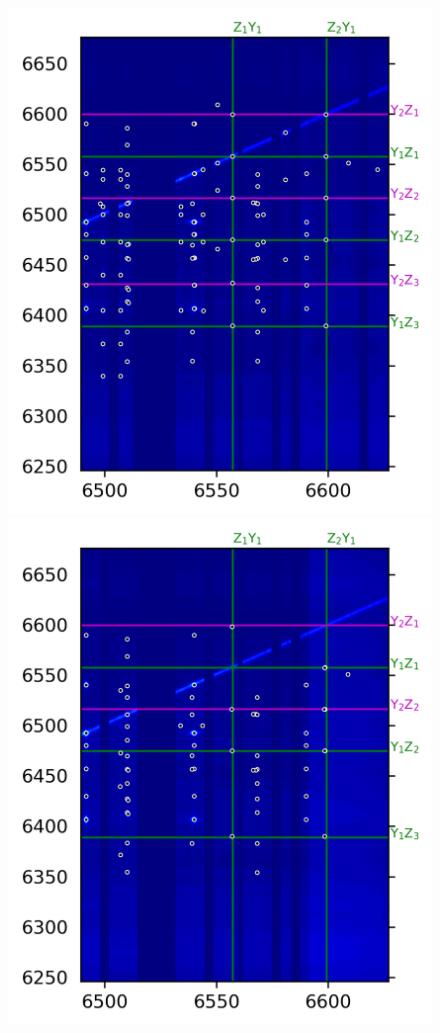\documentclass[12pt]{report}
\begin{document}
\begin{figure}[b]
{  \includegraphics[scale=0.97]{JinD_site4_60K}\hfill
  \includegraphics[scale=0.97]{JinD_site4_106K}
}
\end{figure}
\end{document}

